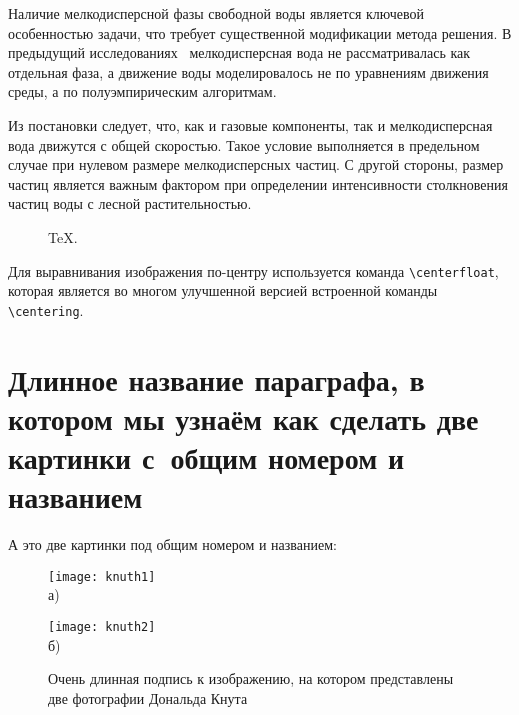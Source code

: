 Наличие мелкодисперсной фазы свободной воды является ключевой особенностью задачи, что требует существенной
модификации метода решения.
В предыдущий исследованиях~\cite{on_the_laws_of_combustion_wave_supp, belyaev_natural_and_artificial_barrier, sergey_on_influence_of_water_barrier_on_forest_fire}
мелкодисперсная вода не рассматривалась как отдельная фаза, а движение воды моделировалось не по уравнениям движения
среды, а по полуэмпирическим алгоритмам.


Из постановки следует, что, как и газовые компоненты, так и мелкодисперсная вода движутся с общей скоростью.
Такое условие выполняется в предельном случае при нулевом размере мелкодисперсных частиц.
С другой стороны, размер частиц является важным фактором при определении интенсивности столкновения частиц воды
с лесной растительностью.

\begin{figure}[ht]
  \caption{TeX.}\label{fig:latex}
\end{figure}

Для выравнивания изображения по-центру используется команда \verb+\centerfloat+, которая является во
многом улучшенной версией встроенной команды \verb+\centering+.

\section{Длинное название параграфа, в котором мы узнаём как сделать две картинки с~общим номером и названием}\label{sec:ch2/sect2}

А это две картинки под общим номером и названием:
\begin{figure}[ht]
  \begin{minipage}[b][][b]{0.49\linewidth}\centering
    \texttt{[image: knuth1]} \\ а)
  \end{minipage}
  \hfill
  \begin{minipage}[b][][b]{0.49\linewidth}\centering
    \texttt{[image: knuth2]} \\ б)
  \end{minipage}
  \caption{Очень длинная подпись к изображению,
      на котором представлены две фотографии Дональда Кнута}
  \label{fig:knuth}
\end{figure}

